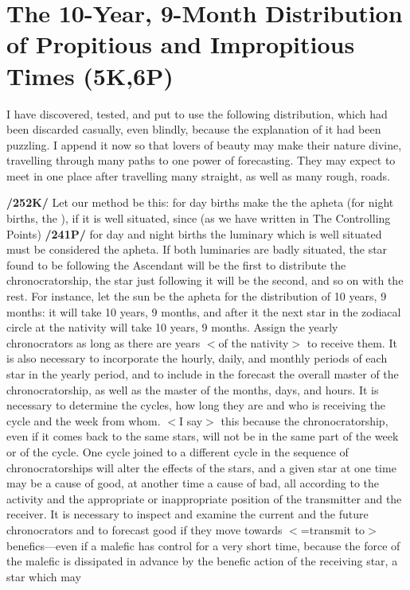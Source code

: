 \section{The 10-Year, 9-Month Distribution of Propitious and Impropitious Times (5K,6P)}

I have discovered, tested, and put to use the following distribution, which had been discarded casually, even blindly, because the explanation of it had been puzzling. I append it now so that lovers of beauty may make their nature divine, travelling through many paths to one power of forecasting. They may expect to meet in one place after travelling many straight, as well as many rough, roads.

\textbf{/252K/} Let our method be this: for day births make the \Sun\xspace the apheta (for night births, the \Moon), if it is well situated, since (as we have written in The Controlling Points) \textbf{/241P/} for day and night births the luminary which is well situated must be considered the apheta. If both luminaries are badly situated, the
star found to be following the Ascendant will be the first to distribute the chronocratorship, the star just
following it will be the second, and so on with the rest.
For instance, let the sun be the apheta for the distribution of 10 years, 9 months: it will take 10 years,
9 months, and after it the next star in the zodiacal circle at the nativity will take 10 years, 9 months.
Assign the yearly chronocrators as long as there are years $<$of the nativity$>$ to receive them. It is also
necessary to incorporate the hourly, daily, and monthly periods of each star in the yearly period, and to
include in the forecast the overall master of the chronocratorship, as well as the master of the months, days,
and hours. It is necessary to determine the cycles, how long they are and who is receiving the cycle and
the week from whom. $<$I say$>$ this because the chronocratorship, even if it comes back to the same stars,
will not be in the same part of the week or of the cycle. One cycle joined to a different cycle in the
sequence of chronocratorships will alter the effects of the stars, and a given star at one time may be a cause
of good, at another time a cause of bad, all according to the activity and the appropriate or inappropriate
position of the transmitter and the receiver.
It is necessary to inspect and examine the current and the future chronocrators and to forecast good if
they move towards $<$=transmit to$>$ benefics—even if a malefic has control for a very short time, because the
force of the malefic is dissipated in advance by the benefic action of the receiving star, a star which may
